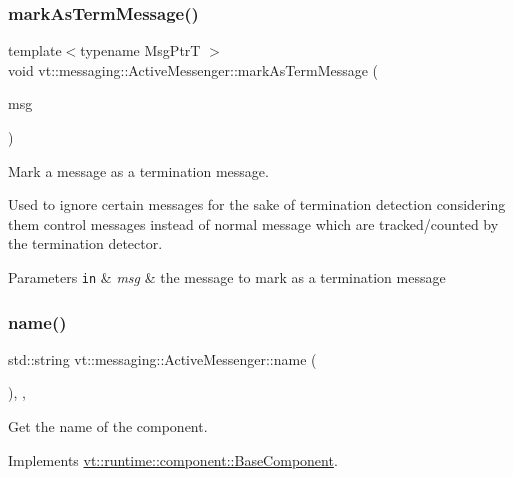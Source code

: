 \subsubsection{\texorpdfstring{mark\+As\+Term\+Message()}{markAsTermMessage()}}
{\footnotesize\ttfamily template$<$typename Msg\+PtrT $>$ \\
void vt\+::messaging\+::\+Active\+Messenger\+::mark\+As\+Term\+Message (\begin{DoxyParamCaption}\item[{Msg\+PtrT const}]{msg }\end{DoxyParamCaption})}



Mark a message as a termination message. 

Used to ignore certain messages for the sake of termination detection considering them control messages instead of normal message which are tracked/counted by the termination detector.


\begin{DoxyParams}[1]{Parameters}
\mbox{\tt in}  & {\em msg} & the message to mark as a termination message \\
\hline
\end{DoxyParams}
\mbox{\label{structvt_1_1messaging_1_1_active_messenger_a42112dea411907ca529bd5bc6586249a}} 
\subsubsection{\texorpdfstring{name()}{name()}}
{\footnotesize\ttfamily std\+::string vt\+::messaging\+::\+Active\+Messenger\+::name (\begin{DoxyParamCaption}{ }\end{DoxyParamCaption})\hspace{0.3cm}{\ttfamily [inline]}, {\ttfamily [override]}, {\ttfamily [virtual]}}



Get the name of the component. 



Implements \hyperlink{structvt_1_1runtime_1_1component_1_1_base_component_a7701485f3539f78d42e6bad47fc7eb78}{vt\+::runtime\+::component\+::\+Base\+Component}.

\mbox{\label{structvt_1_1messaging_1_1_active_messenger_a9799bd2681540170faa04b424d3c849e}} 
